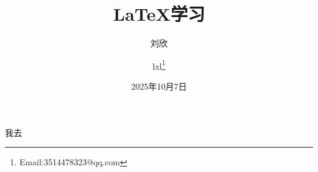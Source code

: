 \documentclass{article}
\title{\LaTeX 学习}
\author{刘欣 \and lxl\thanks{Email:3514478323@qq.com} }
\date{2025年10月7日}
\begin{document}
        
\maketitle              %
我去
\end{document}
